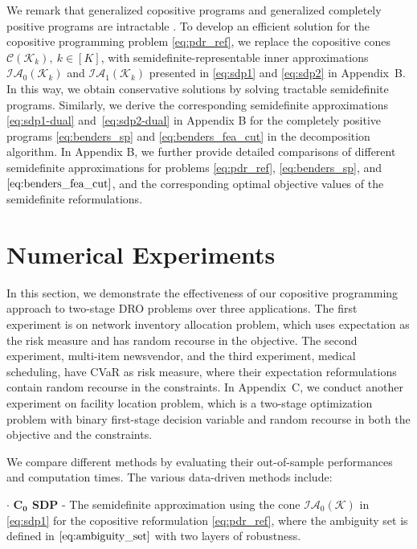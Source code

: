 \documentclass{article}
\begin{document}
We remark that generalized copositive programs and generalized completely positive programs are intractable \cite{copositive-program}. To develop an efficient solution for the copositive programming problem \eqref{eq:pdr_ref}, we replace the copositive cones $\mathcal{C}(\mathcal K_k), \ k \in [K]$, with semidefinite-representable inner approximations $\mathcal{IA}_0(\mathcal K_k)$ and $\mathcal{IA}_1(\mathcal K_k)$ presented in \eqref{eq:sdp1} and \eqref{eq:sdp2} in Appendix~B. In this way, we obtain conservative solutions by solving tractable semidefinite programs. Similarly, we derive the corresponding semidefinite approximations \eqref{eq:sdp1-dual} and~\eqref{eq:sdp2-dual} in Appendix B for the completely positive programs \eqref{eq:benders_sp} and \eqref{eq:benders_fea_cut} in the decomposition algorithm. In Appendix B, we further provide detailed comparisons of different semidefinite approximations for problems \eqref{eq:pdr_ref}, \eqref{eq:benders_sp}, and $\eqref{eq:benders_fea_cut}$, and the corresponding optimal objective values of the semidefinite reformulations.

\section{Numerical Experiments}
\label{experiments}

In this section, we demonstrate the effectiveness of our copositive programming approach to two-stage DRO problems over three applications. The first experiment is on  network inventory allocation problem, which uses expectation as the risk measure and has random recourse in the objective. The second experiment, multi-item newsvendor, and the third experiment, medical scheduling, have CVaR as risk measure, where their expectation reformulations contain random recourse in the constraints. In Appendix~C, we conduct another experiment on facility location problem, which is a two-stage optimization problem with binary first-stage decision variable and random recourse in both the objective and the constraints. 

We compare different methods by evaluating their %
out-of-sample performances and computation times. The various data-driven methods include:

$\bm \cdot$ \textbf{$\mathbf{C_0}$ SDP} - The semidefinite approximation using the cone $\mathcal{IA}_0\mathcal{(K)}$ in  \eqref{eq:sdp1} for the copositive reformulation \eqref{eq:pdr_ref}, where the ambiguity set is defined in $\eqref{eq:ambiguity_set}$ with two layers of robustness. 
\end{document}
